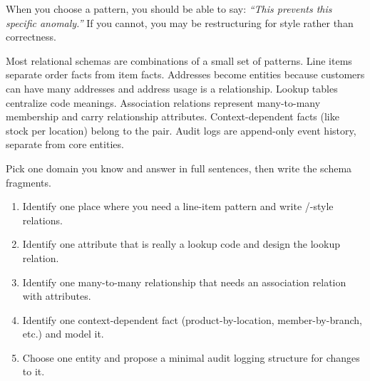 When you choose a pattern, you should be able to say:
\emph{“This prevents this specific anomaly.”}
If you cannot, you may be restructuring for style rather than correctness.

\begin{chaptersummary}
Most relational schemas are combinations of a small set of patterns.
Line items separate order facts from item facts.
Addresses become entities because customers can have many addresses and address usage is a relationship.
Lookup tables centralize code meanings.
Association relations represent many-to-many membership and carry relationship attributes.
Context-dependent facts (like stock per location) belong to the pair.
Audit logs are append-only event history, separate from core entities.
\end{chaptersummary}

\begin{exercisebox}
Pick one domain you know and answer in full sentences, then write the schema fragments.
\begin{enumerate}[label=\arabic*.]
  \item Identify one place where you need a line-item pattern and write /-style relations.
  \item Identify one attribute that is really a lookup code and design the lookup relation.
  \item Identify one many-to-many relationship that needs an association relation with attributes.
  \item Identify one context-dependent fact (product-by-location, member-by-branch, etc.) and model it.
  \item Choose one entity and propose a minimal audit logging structure for changes to it.
\end{enumerate}
\end{exercisebox}
